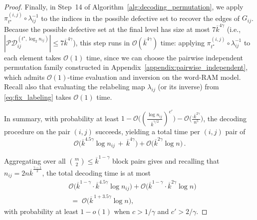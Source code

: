 \documentclass[journal]{IEEEtran}
\theoremstyle{definition}
\theoremstyle{definition}
\newcommand{\kb}{\overline{k}}
\newcommand{\bigO}{\mathcal{O}}
\begin{document}
\begin{proof}
Finally, in Step~14 of Algorithm~\ref{alg:decoding_permutation}, we apply $\pi_{t^{\star}}^{(i,j)} \circ \lambda_{ij}^{-1}$ to the indices in the possible defective set to recover the edges of $G_{ij}$. Because the possible defective set at the final level has size at most \(7\kb^{4\gamma}\) (i.e., \(|\mathcal{PD}_{ij}^{(t^{\star},\log_2 n_{ij})}| \le 7\kb^{4\gamma}\)), this step runs in \(\bigO(\kb^{4\gamma})\) time: applying \(\pi_{t^{\star}}^{(i,j)} \circ \lambda_{ij}^{-1}\) to each element takes \(\bigO(1)\) time, since we can choose the pairwise independent permutation family constructed in Appendix~\ref{appendix:pairwise_independent}, which admits \(\bigO(1)\)-time evaluation and inversion on the word-RAM model.  Recall also that evaluating the relabeling map $\lambda_{ij}$ (or its inverse) from \eqref{eq:fix_labeling} takes $\bigO(1)$ time. 



In summary, with probability at least
\(1-\bigO \bigl((\tfrac{\log n_{ij}}{\kb^{\gamma/2}})^{c'}\bigr)
 - \bigO \bigl(\tfrac{ \cdot \kb^{2\gamma}}{n^{5}}\bigr)\), the decoding procedure on the pair \((i,j)\) succeeds, yielding a total time per $(i,j)$ pair of
\[
\bigO\big(\kb^{4.5\gamma}\log n_{ij} \,+\, \kb^{4\gamma}\big) + \bigO \big(\kb^{2\gamma} \log n \big) \, .
\]

Aggregating over all \(\binom{m}{2}\leq \kb^{1-\gamma}\) block pairs gives and recalling that $n_{ij} = 2n\kb^{\frac{\gamma-1}{2}}$, the total decoding time is at most
\begin{align*}
    &\bigO\big(\kb^{1-\gamma}\cdot \kb^{4.5\gamma}\log n_{ij}\big) 
     + \bigO\big(\kb^{1-\gamma}\cdot \kb^{2\gamma}\log n\big) \\
    &\;=\; \bigO\big(\kb^{\,1+3.5\gamma}\log n\big),
\end{align*}
with probability at least \(1-o(1)\) when \(c>1/\gamma\) and \(c' > 2/\gamma\).





\end{proof}
\end{document}
